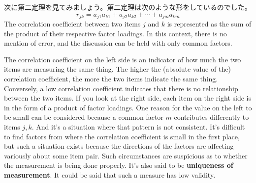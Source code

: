 \documentclass{ltjsbook}
\begin{document}
次に第二定理を見てみましょう。第二定理は次のような形をしているのでした。
\[  r_{jk}=a_{j1}a_{k1}+a_{j2}a_{k2}+ \cdots +a_{jm}a_{km} \]
The correlation coefficient between two items $j$ and $k$ is represented as the sum of the product of their respective factor loadings. In this context, there is no mention of error, and the discussion can be held with only common factors.

The correlation coefficient on the left side is an indicator of how much the two items are measuring the same thing. The higher the (absolute value of the) correlation coefficient, the more the two items indicate the same thing. Conversely, a low correlation coefficient indicates that there is no relationship between the two items. If you look at the right side, each item on the right side is in the form of a product of factor loadings. One reason for the value on the left to be small can be considered because a common factor $m$ contributes differently to items $j,k$. And it's a situation where that pattern is not consistent. It's difficult to find factors from where the correlation coefficient is small in the first place, but such a situation exists because the directions of the factors are affecting variously about some item pair. Such circumstances are suspicious as to whether the measurement is being done properly. It's also said to be \textbf{uniqueness of measurement}.
It could be said that such a measure has low validity.
\end{document}
